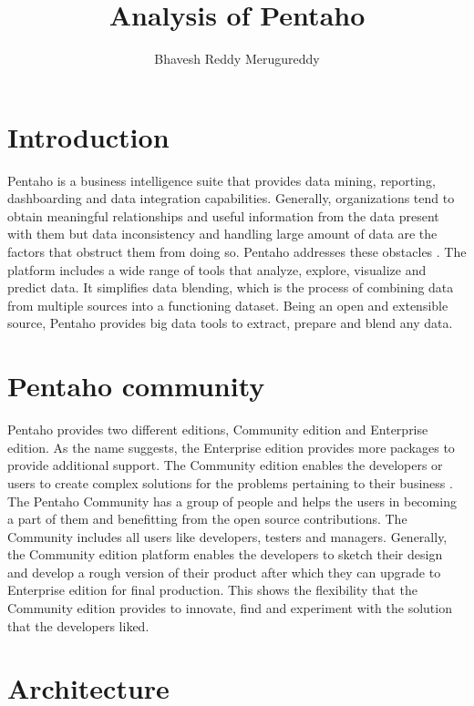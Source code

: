 \documentclass[9pt,twocolumn,twoside]{../../styles/osajnl}
\title{ Analysis of Pentaho}
\author[1,*]{Bhavesh Reddy Merugureddy}
\affil[1]{School of Informatics and Computing, Bloomington, IN 47408, U.S.A.}
\affil[*]{Corresponding authors: bmerugur@umail.iu.edu}
\begin{document}
\maketitle

\section{Introduction}

Pentaho is a business intelligence suite that provides data mining,
reporting, dashboarding and data integration capabilities. Generally,
organizations tend to obtain meaningful relationships and useful
information from the data present with them but data inconsistency and
handling large amount of data are the factors that obstruct them from
doing so. Pentaho addresses these obstacles
\cite{pentaho_wikipedia}. The platform includes a wide range of tools
that analyze, explore, visualize and predict data. It simplifies data
blending, which is the process of combining data from multiple sources
into a functioning dataset. Being an open and extensible source,
Pentaho provides big data tools to extract, prepare and blend any
data.

\section{Pentaho community}

Pentaho provides two different editions, Community edition and
Enterprise edition. As the name suggests, the Enterprise edition
provides more packages to provide additional support. The Community
edition enables the developers or users to create complex solutions
for the problems pertaining to their business
\cite{pentaho-community}. The Pentaho Community has a group of people
and helps the users in becoming a part of them and benefitting from
the open source contributions. The Community includes all users like
developers, testers and managers. Generally, the Community edition
platform enables the developers to sketch their design and develop a
rough version of their product after which they can upgrade to
Enterprise edition for final production. This shows the flexibility
that the Community edition provides to innovate, find and experiment
with the solution that the developers liked.

\section{Architecture}
\end{document}
